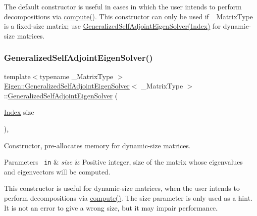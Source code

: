 The default constructor is useful in cases in which the user intends to perform decompositions via \mbox{\hyperlink{class_eigen_1_1_generalized_self_adjoint_eigen_solver_a724764fe196612b752042692156ed023}{compute()}}. This constructor can only be used if {\ttfamily \+\_\+\+Matrix\+Type} is a fixed-\/size matrix; use \mbox{\hyperlink{class_eigen_1_1_generalized_self_adjoint_eigen_solver_aac849f01a8c6148c645acd10bd3a9b0e}{Generalized\+Self\+Adjoint\+Eigen\+Solver(\+Index)}} for dynamic-\/size matrices. \mbox{\label{class_eigen_1_1_generalized_self_adjoint_eigen_solver_aac849f01a8c6148c645acd10bd3a9b0e}} 
\subsubsection{\texorpdfstring{GeneralizedSelfAdjointEigenSolver()}{GeneralizedSelfAdjointEigenSolver()}\hspace{0.1cm}{\footnotesize\ttfamily [2/3]}}
{\footnotesize\ttfamily template$<$typename \+\_\+\+Matrix\+Type $>$ \\
\mbox{\hyperlink{class_eigen_1_1_generalized_self_adjoint_eigen_solver}{Eigen\+::\+Generalized\+Self\+Adjoint\+Eigen\+Solver}}$<$ \+\_\+\+Matrix\+Type $>$\+::\mbox{\hyperlink{class_eigen_1_1_generalized_self_adjoint_eigen_solver}{Generalized\+Self\+Adjoint\+Eigen\+Solver}} (\begin{DoxyParamCaption}\item[{\mbox{\hyperlink{class_eigen_1_1_self_adjoint_eigen_solver_a8a59ab7734b6eae2754fd78bc7c3a360}{Index}}}]{size }\end{DoxyParamCaption})\hspace{0.3cm}{\ttfamily [inline]}, {\ttfamily [explicit]}}



Constructor, pre-\/allocates memory for dynamic-\/size matrices. 


\begin{DoxyParams}[1]{Parameters}
\mbox{\texttt{ in}}  & {\em size} & Positive integer, size of the matrix whose eigenvalues and eigenvectors will be computed.\\
\hline
\end{DoxyParams}
This constructor is useful for dynamic-\/size matrices, when the user intends to perform decompositions via \mbox{\hyperlink{class_eigen_1_1_generalized_self_adjoint_eigen_solver_a724764fe196612b752042692156ed023}{compute()}}. The {\ttfamily size} parameter is only used as a hint. It is not an error to give a wrong {\ttfamily size}, but it may impair performance.

